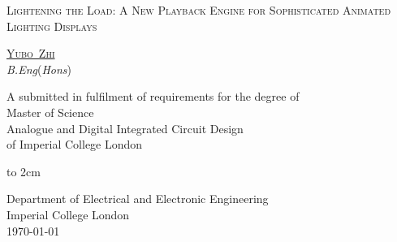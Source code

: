 \thispagestyle{empty}

\begin{center}
\null {}
\renewcommand{\baselinestretch}{2}

{\huge \textsc{Lightening the Load: A New Playback Engine for Sophisticated Animated Lighting Displays} \par}

\textsc{\large\href{yz4116@imperial.ac.uk}{Yubo~Zhi}} \\
\textit{B.Eng}(\textit{Hons})\\

A  submitted in fulfilment of requirements for the degree of \\
Master of Science\\
Analogue and Digital Integrated Circuit Design\\
of Imperial College London

\centerline{\hbox to 2cm{}}




Department of Electrical and Electronic Engineering\\
Imperial College London\\
\today

\end{center}


